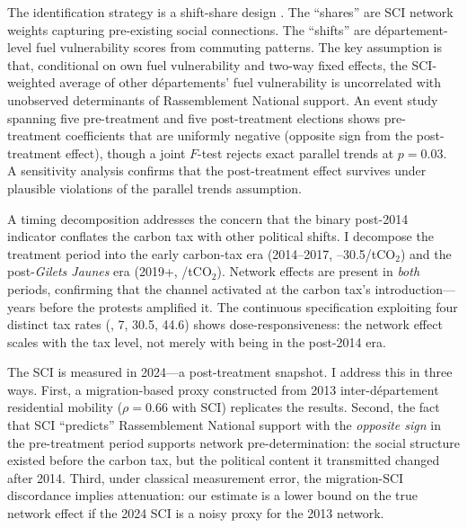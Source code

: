 \documentclass[12pt]{article}
\providecommand{\euro}{\texteuro}
\newcommand{\rn}{Rassemblement National}
\newcommand{\gj}{\textit{Gilets Jaunes}}
\newcommand{\dept}{d\'{e}partement}
\newcommand{\depts}{d\'{e}partements}
\begin{document}
The identification strategy is a shift-share design \citep{goldsmith2020bartik, borusyak2022quasi}. The ``shares'' are SCI network weights capturing pre-existing social connections. The ``shifts'' are \dept{}-level fuel vulnerability scores from commuting patterns. The key assumption is that, conditional on own fuel vulnerability and two-way fixed effects, the SCI-weighted average of other \depts{}' fuel vulnerability is uncorrelated with unobserved determinants of \rn{} support. An event study spanning five pre-treatment and five post-treatment elections shows pre-treatment coefficients that are uniformly negative (opposite sign from the post-treatment effect), though a joint $F$-test rejects exact parallel trends at $p = 0.03$. A \citet{rambachan2023more} sensitivity analysis confirms that the post-treatment effect survives under plausible violations of the parallel trends assumption.

A timing decomposition addresses the concern that the binary post-2014 indicator conflates the carbon tax with other political shifts. I decompose the treatment period into the early carbon-tax era (2014--2017, \euro 7--30.5/tCO$_2$) and the post-\gj{} era (2019+, \euro 44.6/tCO$_2$). Network effects are present in \emph{both} periods, confirming that the channel activated at the carbon tax's introduction---years before the protests amplified it. The continuous specification exploiting four distinct tax rates (\euro 0, 7, 30.5, 44.6) shows dose-responsiveness: the network effect scales with the tax level, not merely with being in the post-2014 era.

The SCI is measured in 2024---a post-treatment snapshot. I address this in three ways. First, a migration-based proxy constructed from 2013 inter-\dept{} residential mobility ($\rho = 0.66$ with SCI) replicates the results. Second, the fact that SCI ``predicts'' \rn{} support with the \emph{opposite sign} in the pre-treatment period supports network pre-determination: the social structure existed before the carbon tax, but the political content it transmitted changed after 2014. Third, under classical measurement error, the migration-SCI discordance implies attenuation: our estimate is a lower bound on the true network effect if the 2024 SCI is a noisy proxy for the 2013 network.
\end{document}
